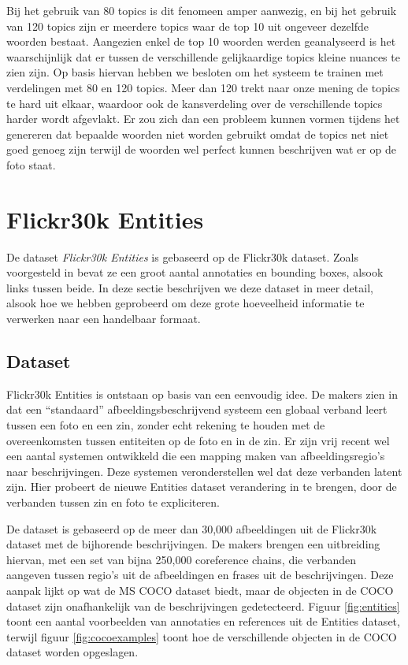 Bij het gebruik van 80 topics is dit fenomeen amper aanwezig, en bij het gebruik van 120 topics zijn er meerdere topics waar de top 10 uit ongeveer dezelfde woorden bestaat. Aangezien enkel de top 10 woorden werden geanalyseerd is het waarschijnlijk dat er tussen de verschillende gelijkaardige topics kleine nuances te zien zijn. Op basis hiervan hebben we besloten om het systeem te trainen met verdelingen met 80 en 120 topics. Meer dan 120 trekt naar onze mening de topics te hard uit elkaar, waardoor ook de kansverdeling over de verschillende topics harder wordt afgevlakt. Er zou zich dan een probleem kunnen vormen tijdens het genereren dat bepaalde woorden niet worden gebruikt omdat de topics net niet goed genoeg zijn terwijl de woorden wel perfect kunnen beschrijven wat er op de foto staat.

\section{Flickr30k Entities}
De dataset \emph{Flickr30k Entities} is gebaseerd op de Flickr30k dataset. Zoals voorgesteld in  bevat ze een groot aantal annotaties en bounding boxes, alsook links tussen beide. In deze sectie beschrijven we deze dataset in meer detail, alsook hoe we hebben geprobeerd om deze grote hoeveelheid informatie te verwerken naar een handelbaar formaat.

\subsection{Dataset}
\label{sub:Dataset}
Flickr30k Entities is ontstaan op basis van een eenvoudig idee. De makers zien in dat een ``standaard'' afbeeldingsbeschrijvend systeem een globaal verband leert tussen een foto en een zin, zonder echt rekening te houden met de overeenkomsten tussen entiteiten op de foto en in de zin. Er zijn vrij recent wel een aantal systemen ontwikkeld die een mapping maken van afbeeldingsregio's naar beschrijvingen. Deze systemen veronderstellen wel dat deze verbanden latent zijn. Hier probeert de nieuwe Entities dataset verandering in te brengen, door de verbanden tussen zin en foto te expliciteren.

De dataset is gebaseerd op de meer dan 30,000 afbeeldingen uit de Flickr30k  dataset met de bijhorende beschrijvingen. De makers brengen een uitbreiding hiervan, met een set van bijna 250,000 coreference chains, die verbanden aangeven tussen regio's uit de afbeeldingen en frases uit de beschrijvingen. Deze aanpak lijkt op wat de MS COCO  dataset biedt, maar de objecten in de COCO dataset zijn onafhankelijk van de beschrijvingen gedetecteerd. Figuur \ref{fig:entities}  toont een aantal voorbeelden van annotaties en references uit de Entities dataset, terwijl figuur \ref{fig:cocoexamples} toont hoe de verschillende objecten in de COCO dataset worden opgeslagen. 

